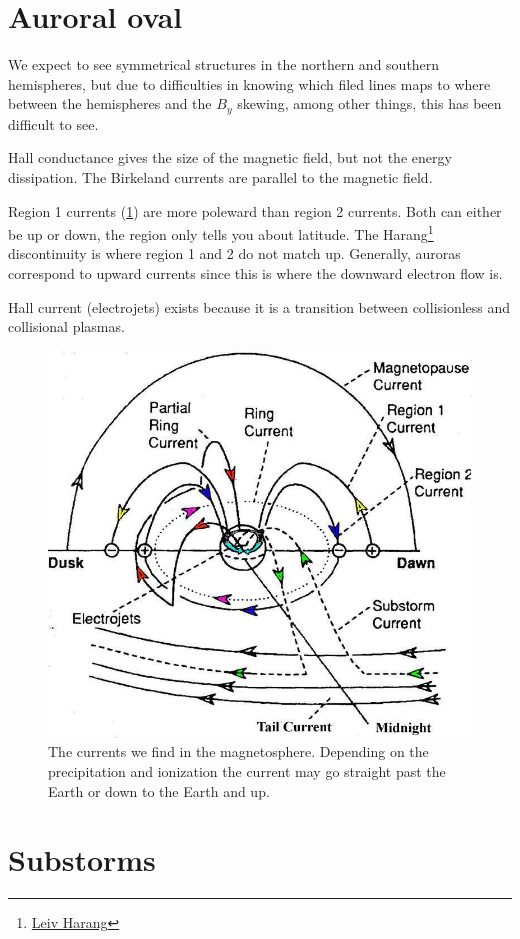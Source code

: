 \section{Auroral oval}
We expect to see symmetrical structures in the northern and southern hemispheres, but due to difficulties in knowing which filed lines maps to where between the hemispheres and the \(B_y\) skewing, among other things, this has been difficult to see.

Hall conductance gives the size of the magnetic field, but not the energy dissipation. The Birkeland currents are parallel to the magnetic field.

Region 1 currents (\cref{fig:L8_all_currents}) are more poleward than region 2 currents. Both can either be up or down, the region only tells you about latitude. The Harang\footnote{\href{https://nbl.snl.no/Leiv_Harang}{Leiv Harang}} discontinuity is where region 1 and 2 do not match up. Generally, auroras correspond to upward currents since this is where the downward electron flow is.

Hall current (electrojets) exists because it is a transition between collisionless and collisional plasmas.
\begin{figure}[t]
    \centering
    \includegraphics[width=.4\linewidth]{bilder/L8_all_currents.jpg}
    \caption{The currents we find in the magnetosphere. Depending on the precipitation and ionization the current may go straight past the Earth or down to the Earth and up.}\label{fig:L8_all_currents}
\end{figure}

\section{Substorms}
